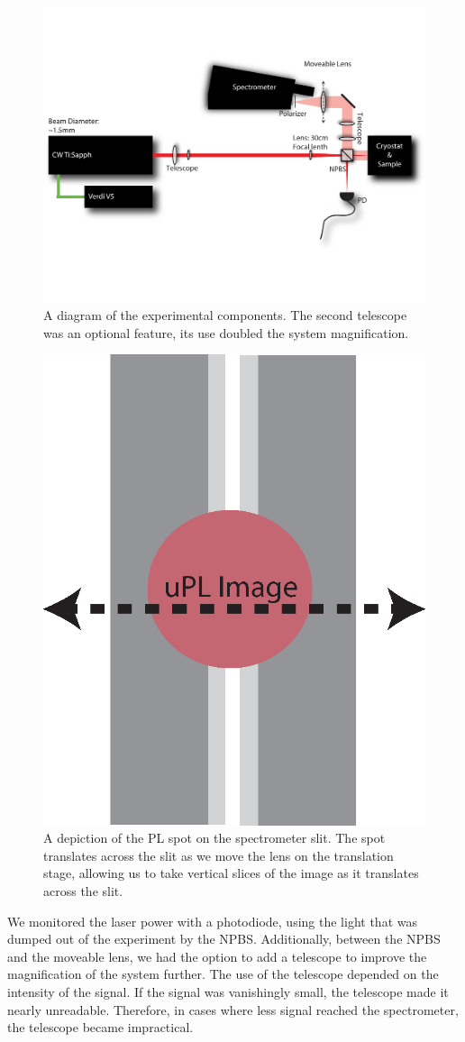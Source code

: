 \begin{figure}[h!]
\centering
\includegraphics[width = \textwidth]{upl.pdf}
\caption{ \doublespacing A diagram of the experimental components. The second telescope was an optional feature, its use doubled the system magnification.}
\label{upl}
\end{figure}
\begin{figure}[h!]
\includegraphics[width = .5\textwidth]{specslit.eps}
\caption{ \doublespacing A depiction of the PL spot on the spectrometer slit. The spot translates across the slit as we move the lens on the translation stage, allowing us to take vertical slices of the image as it translates across the slit.}
\label{slit}
\end{figure}
\indent We monitored the laser power with a photodiode, using the light that was dumped out of the experiment by the NPBS. Additionally, between the NPBS and the moveable lens, we had the option to add a telescope to improve the magnification of the system further. The use of the telescope depended on the intensity of the signal. If the signal was vanishingly small, the telescope made it nearly unreadable. Therefore, in cases where less signal reached the spectrometer, the telescope became impractical.

